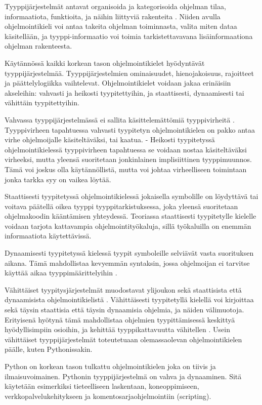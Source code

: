\begin{otherlanguage}{finnish}
Tyyppijärjestelmät antavat organisoida ja kategorisoida ohjelman tilaa, informaatiota, funktioita, ja näihin liittyviä rakenteita \cite{programming_langs}. Niiden avulla ohjelmointikieli voi antaa takeita ohjelman toiminnasta, valita miten dataa käsitellään, ja tyyppi-informaatio voi toimia tarkistettavavana lisäinformaationa ohjelman rakenteesta.

Käytännössä kaikki korkean tason ohjelmointikielet hyödyntävät tyyppijärjestelmää. Tyyppijärjestelmien ominaisuudet, hienojakoisuus, rajoitteet ja päättelylogiikka vaihtelevat. Ohjelmointikielet voidaan jakaa erinäisiin akseleihin: vahvasti ja heikosti tyypitettyihin, ja staattisesti, dynaamisesti tai vähittäin tyypitettyihin.

Vahvassa tyyppijärjestelmässä ei sallita käsittelemättömiä tyyppivirheitä \cite{cardelli_typeful_1989}. Tyyppivirheen tapahtuessa vahvasti tyypitetyn ohjelmointikielen on pakko antaa virhe ohjelmoijalle käsiteltäväksi, tai kaatua.
- Heikosti tyypitetyssä ohjelmointikielessä tyyppivirheen tapahtuessa se voidaan nostaa käsiteltäväksi virheeksi, mutta yleensä suoritetaan jonkinlainen implisiittinen tyyppimuunnos. Tämä voi joskus olla käytännöllistä, mutta voi johtaa virheelliseen toimintaan jonka tarkka syy on vaikea löytää.

Staattisesti tyypitetyssä ohjelmointikielessä jokaisella symbolille on löydyttävä tai voitava päätellä oikea tyyppi tyyppitarkistuksessa, joka yleensä suoritetaan ohjelmakoodin kääntämisen yhteydessä. Teoriassa staattisesti tyypitetylle kielelle voidaan tarjota kattavampia ohjelmointityökaluja, sillä työkaluilla on enemmän informaatiota käytettävissä.

Dynaamisesti tyypitetyssä kielessä tyypit symboleille selviävät vasta suorituksen aikana. Tämä mahdollistaa kevyemmän syntaksin, jossa ohjelmoijan ei tarvitse käyttää aikaa tyyppimäärittelyihin \cite{di_grazia_evolution_2022}.

Vähittäiset tyypitysjärjestelmät muodostavat ylijoukon sekä staattisista että dynaamisista ohjelmointikielistä \cite{siek_refined_gradual_2015}. Vähittäisesti tyypitetyllä kielellä voi kirjoittaa sekä täysin staattisia että täysin dynaamisia ohjelmia, ja näiden välimuotoja. Erityisenä hyötynä tämä mahdollistaa ohjelmien tyypittämisessä keskittyä hyödyllisimpiin osioihin, ja kehittää tyyppikattavuutta vähitellen \cite{siek_refined_gradual_2015}. Usein vähittäiset tyyppijärjestelmät toteutetuaan olemassaolevan ohjelmointikielen päälle, kuten Pythonissakin.

Python on korkean tason tulkattu ohjelmointikielen joka on tiivis ja ilmaisuvoimainen. Pythonin tyyppijärjestelmä on vahva ja dynaaminen. Sitä käytetään esimerkiksi tieteelliseen laskentaan, koneoppimiseen, verkkopalvelukehitykseen ja komentosarjaohjelmointiin (scripting).


\end{otherlanguage}
